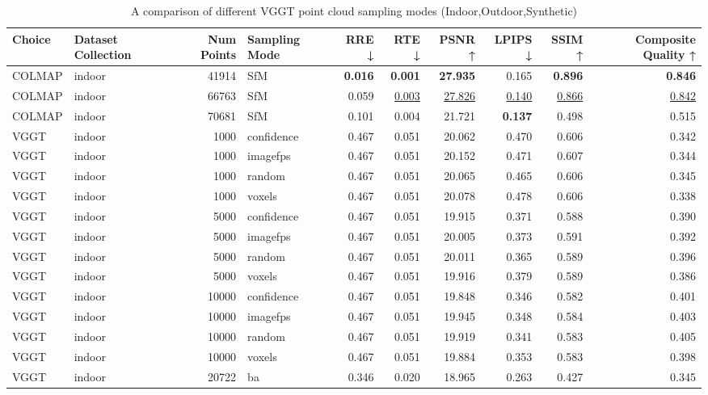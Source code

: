 \begin{table}[H]
\caption{\ifdefined\customcaption \customcaption \else A comparison of different VGGT point cloud sampling modes (Indoor,Outdoor,Synthetic) \fi}
\label{tab:03_sampling_mode_indoor,outdoor,synthetic}
\centering
\tiny
\begin{tabular}{llrlrrrrrr}
\toprule
Choice & Dataset Collection & Num Points & Sampling Mode & RRE ↓ & RTE ↓ & PSNR ↑ & LPIPS ↓ & SSIM ↑ & Composite Quality ↑ \\
\midrule
COLMAP & indoor & 41914 & SfM & \textbf{0.016} & \textbf{0.001} & \textbf{27.935} & 0.165 & \textbf{0.896} & \textbf{0.846} \\
COLMAP & indoor & 66763 & SfM & 0.059 & \underline{0.003} & \underline{27.826} & \underline{0.140} & \underline{0.866} & \underline{0.842} \\
COLMAP & indoor & 70681 & SfM & 0.101 & 0.004 & 21.721 & \textbf{0.137} & 0.498 & 0.515 \\
VGGT & indoor & 1000 & confidence & 0.467 & 0.051 & 20.062 & 0.470 & 0.606 & 0.342 \\
VGGT & indoor & 1000 & imagefps & 0.467 & 0.051 & 20.152 & 0.471 & 0.607 & 0.344 \\
VGGT & indoor & 1000 & random & 0.467 & 0.051 & 20.065 & 0.465 & 0.606 & 0.345 \\
VGGT & indoor & 1000 & voxels & 0.467 & 0.051 & 20.078 & 0.478 & 0.606 & 0.338 \\
VGGT & indoor & 5000 & confidence & 0.467 & 0.051 & 19.915 & 0.371 & 0.588 & 0.390 \\
VGGT & indoor & 5000 & imagefps & 0.467 & 0.051 & 20.005 & 0.373 & 0.591 & 0.392 \\
VGGT & indoor & 5000 & random & 0.467 & 0.051 & 20.011 & 0.365 & 0.589 & 0.396 \\
VGGT & indoor & 5000 & voxels & 0.467 & 0.051 & 19.916 & 0.379 & 0.589 & 0.386 \\
VGGT & indoor & 10000 & confidence & 0.467 & 0.051 & 19.848 & 0.346 & 0.582 & 0.401 \\
VGGT & indoor & 10000 & imagefps & 0.467 & 0.051 & 19.945 & 0.348 & 0.584 & 0.403 \\
VGGT & indoor & 10000 & random & 0.467 & 0.051 & 19.919 & 0.341 & 0.583 & 0.405 \\
VGGT & indoor & 10000 & voxels & 0.467 & 0.051 & 19.884 & 0.353 & 0.583 & 0.398 \\
VGGT & indoor & 20722 & ba & 0.346 & 0.020 & 18.965 & 0.263 & 0.427 & 0.345 \\

\end{tabular}
\end{table}
